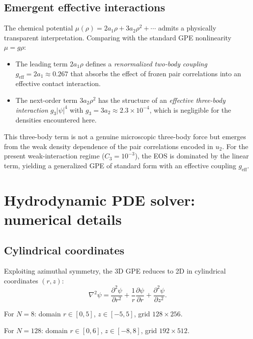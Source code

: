 \documentclass[aps,prl,onecolumn,superscriptaddress,longbibliography,nofootinbib]{revtex4-2}
\begin{document}
\subsection{Emergent effective interactions}

The chemical potential $\mu(\rho)=2a_1\rho+3a_2\rho^2+\cdots$ admits
a physically transparent interpretation.  Comparing with the standard
GPE nonlinearity $\mu=g\rho$:
\begin{itemize}
\item The leading term $2a_1\rho$ defines a \emph{renormalized
two-body coupling} $g_{\mathrm{eff}}=2a_1\approx 0.267$ that absorbs
the effect of frozen pair correlations into an effective contact
interaction.
\item The next-order term $3a_2\rho^2$ has the structure of an
\emph{effective three-body interaction} $g_3|\psi|^4$ with
$g_3=3a_2\approx 2.3\times10^{-4}$, which is negligible for the
densities encountered here.
\end{itemize}
This three-body term is not a genuine microscopic three-body force but
emerges from the weak density dependence of the pair correlations
encoded in $u_2$.  For the present weak-interaction regime
($C_3=10^{-3}$), the EOS is dominated by the linear term, yielding a
generalized GPE of standard form with an effective coupling
$g_{\mathrm{eff}}$.

\section{Hydrodynamic PDE solver: numerical details}
\label{sec:solver}

\subsection{Cylindrical coordinates}

Exploiting azimuthal symmetry, the 3D GPE reduces to 2D in cylindrical
coordinates $(r,z)$:
\begin{equation}
\nabla^2\psi = \frac{\partial^2\psi}{\partial r^2}
+ \frac{1}{r}\frac{\partial\psi}{\partial r}
+ \frac{\partial^2\psi}{\partial z^2}.
\end{equation}

For $N=8$: domain $r\in[0,5]$, $z\in[-5,5]$, grid $128\times 256$.

For $N=128$: domain $r\in[0,6]$, $z\in[-8,8]$, grid $192\times 512$.
\end{document}
